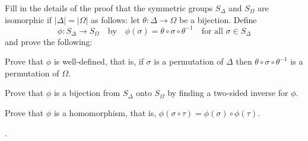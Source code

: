 \begin{exercise} \label{ex1.6.10}
    Fill in the details of the proof that the symmetric groups $S_\Delta$ and $S_\Omega$ are isomorphic if $|\Delta| = |\Omega|$ as follows: let $\theta : \Delta \to \Omega$ be a bijection. Define
    \[
    \phi : S_\Delta \to S_\Omega \quad \text{by} \quad \phi(\sigma) = \theta \circ \sigma \circ \theta^{-1} \quad \text{for all } \sigma \in S_\Delta
    \]
    and prove the following:
    \begin{subproblems}
        \item Prove that $\phi$ is well-defined, that is, if $\sigma$ is a permutation of $\Delta$ then $\theta \circ \sigma \circ \theta^{-1}$ is a permutation of $\Omega$.
        \item Prove that $\phi$ is a bijection from $S_\Delta$ onto $S_\Omega$ by finding a two-sided inverse for $\phi$.
        \item Prove that $\phi$ is a homomorphism, that is, $\phi(\sigma \circ \tau) = \phi(\sigma) \circ \phi(\tau)$.
    \end{subproblems}
    .
\end{exercise}

